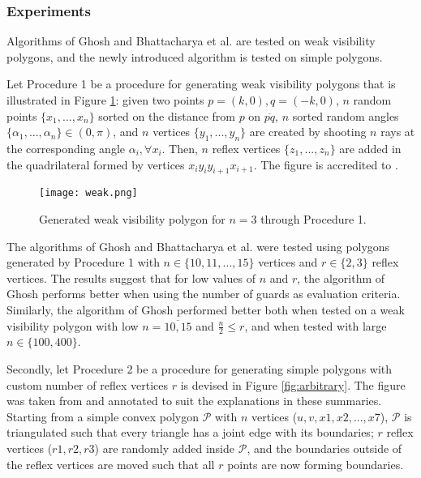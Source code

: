 \subsubsection{Experiments}
Algorithms of Ghosh \cite{GHOSH2010718} and Bhattacharya et al. \cite{bhattacharya2016approximability} are tested on weak visibility polygons, and the newly introduced algorithm is tested on simple polygons. 

Let Procedure 1 be a procedure for generating weak visibility polygons that is illustrated in Figure \ref{fig:weak}: given two points $p = (k, 0), q = (-k, 0)$,  $n$ random points $\{x_1, ..., x_n\}$ sorted on the distance from $p$ on $\overline{pq}$, $n$ sorted random angles $\{\alpha_1, ..., \alpha_n\} \in  (0, \pi)$, and $n$ vertices $\{y_1, ..., y_n\}$ are created by shooting $n$ rays at the corresponding angle $\alpha_i, \forall x_i$. Then, $n$ reflex vertices $\{z_1, ..., z_n\}$ are added in the quadrilateral formed by vertices $x_iy_iy_{i + 1}x_{i + 1}$. The figure is accredited to \cite{maleki2022implementation}.

\begin{figure}[h!]
    \centering
    \texttt{[image: weak.png]}
    \caption{Generated weak visibility polygon for $n = 3$ \cite{maleki2022implementation} through Procedure 1.}
    \label{fig:weak}
\end{figure}

The algorithms of Ghosh \cite{GHOSH2010718} and Bhattacharya et al. \cite{bhattacharya2016approximability} were tested using polygons generated by Procedure 1 with $n \in \{10, 11, ..., 15\}$ vertices and $r \in \{2, 3\}$ reflex vertices. The results suggest that for low values of $n$ and $r$, the algorithm of Ghosh \cite{GHOSH2010718} performs better when using the number of guards as evaluation criteria. 
Similarly, the algorithm of Ghosh \cite{GHOSH2010718} performed better both when tested on a weak visibility polygon with low $n = \overline{10, 15}$ and $\frac n 2 \leq r$, and when tested with large $n \in \{100, 400\}$.

Secondly, let Procedure 2 be a procedure for generating simple polygons with custom number of reflex vertices $r$ is devised in Figure \ref{fig:arbitrary}. The figure was taken from \cite{maleki2022implementation} and annotated to suit the explanations in these summaries. Starting from a simple convex polygon $\mathcal P$ with $n$ vertices ($u, v, x1, x2, ..., x7$), $\mathcal P$ is triangulated such that every triangle has a joint edge with its boundaries; $r$ reflex vertices ($r1, r2, r3$) are randomly added inside $\mathcal P$, and the boundaries outside of the reflex vertices are moved such that all $r$ points are now forming boundaries. 


